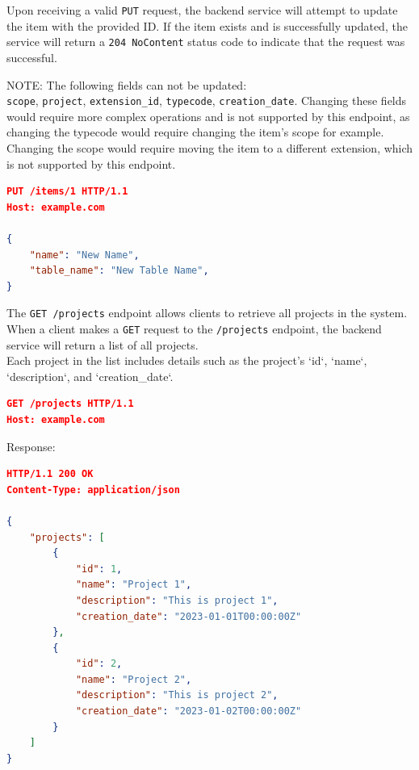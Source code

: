 Upon receiving a valid \texttt{PUT} request, the backend service will attempt to update the item with the provided ID.
If the item exists and is successfully updated, the service will return a \texttt{204 NoContent} status code to indicate that the request was successful.

\begin{mynote}
    NOTE: The following fields can not be updated: \\ \texttt{scope}, \texttt{project}, \texttt{extension\_id}, \texttt{typecode}, \texttt{creation\_date}.
    Changing these fields would require more complex operations and is not supported by this endpoint, as changing the typecode would require changing the item's scope for example.
    Changing the scope would require moving the item to a different extension, which is not supported by this endpoint.
\end{mynote}

\begin{lstlisting}[language=json,label={lst:lstlisting21}]
PUT /items/1 HTTP/1.1
Host: example.com

{
    "name": "New Name",
    "table_name": "New Table Name",
}

\end{lstlisting}


The \texttt{GET /projects} endpoint allows clients to retrieve all projects in the system.
When a client makes a \texttt{GET} request to the \texttt{/projects} endpoint, the backend service will return a list of all projects.
\\Each project in the list includes details such as the project's `id`, `name`, `description`, and `creation\_date`.

\begin{lstlisting}[language=json,label={lst:lstlisting11}]
GET /projects HTTP/1.1
Host: example.com
\end{lstlisting}

Response:

\begin{lstlisting}[language=json,label={lst:lstlisting12}]
HTTP/1.1 200 OK
Content-Type: application/json

{
    "projects": [
        {
            "id": 1,
            "name": "Project 1",
            "description": "This is project 1",
            "creation_date": "2023-01-01T00:00:00Z"
        },
        {
            "id": 2,
            "name": "Project 2",
            "description": "This is project 2",
            "creation_date": "2023-01-02T00:00:00Z"
        }
    ]
}
\end{lstlisting}

